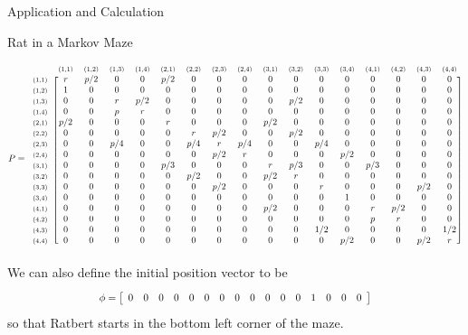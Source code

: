 \documentclass[12pt]{article}
\newcommand{\matindex}[1]{\mbox{\scriptsize#1}}
\newcommand\scalemath[2]{\scalebox{#1}{\mbox{\ensuremath{\displaystyle #2}}}}
\numberwithin{equation}{section}
\begin{document}
\begin{section}{Application and Calculation}
\begin{subsection}{Rat in a Markov Maze}
\begin{enumerate}
    \[\scalemath{0.75}{P=\begin{blockarray}{ccccccccccccccccc}&\matindex{(1,1)}&\matindex{(1,2)}&\matindex{(1,3)}&\matindex{(1,4)}&\matindex{(2,1)}&\matindex{(2,2)}&\matindex{(2,3)}&\matindex{(2,4)}&\matindex{(3,1)}&\matindex{(3,2)}&\matindex{(3,3)}&\matindex{(3,4)}&\matindex{(4,1)}&\matindex{(4,2)}&\matindex{(4,3)}&\matindex{(4,4)}\\
        \begin{block}{c[cccccccccccccccc]}\matindex{(1,1)}&r&p/2&0&0&p/2&0&0&0&0&0&0&0&0&0&0&0\\
        \matindex{(1,2)}&1&0&0&0&0&0&0&0&0&0&0&0&0&0&0&0\\
        \matindex{(1,3)}&0&0&r&p/2&0&0&0&0&0&p/2&0&0&0&0&0&0\\
        \matindex{(1,4)}&0&0&p&r&0&0&0&0&0&0&0&0&0&0&0&0\\
        \matindex{(2,1)}&p/2&0&0&0&r&0&0&0&p/2&0&0&0&0&0&0&0\\
        \matindex{(2,2)}&0&0&0&0&0&r&p/2&0&0&p/2&0&0&0&0&0&0\\
        \matindex{(2,3)}&0&0&p/4&0&0&p/4&r&p/4&0&0&p/4&0&0&0&0&0\\
        \matindex{(2,4)}&0&0&0&0&0&0&p/2&r&0&0&0&p/2&0&0&0&0\\
        \matindex{(3,1)}&0&0&0&0&p/3&0&0&0&r&p/3&0&0&p/3&0&0&0\\
        \matindex{(3,2)}&0&0&0&0&0&p/2&0&0&p/2&r&0&0&0&0&0&0\\
        \matindex{(3,3)}&0&0&0&0&0&0&p/2&0&0&0&r&0&0&0&p/2&0\\
        \matindex{(3,4)}&0&0&0&0&0&0&0&0&0&0&0&1&0&0&0&0\\
        \matindex{(4,1)}&0&0&0&0&0&0&0&0&p/2&0&0&0&r&p/2&0&0\\
        \matindex{(4,2)}&0&0&0&0&0&0&0&0&0&0&0&0&p&r&0&0\\
        \matindex{(4,3)}&0&0&0&0&0&0&0&0&0&0&1/2&0&0&0&0&1/2\\
        \matindex{(4,4)}&0&0&0&0&0&0&0&0&0&0&0&p/2&0&0&p/2&r\\
        \end{block}
        \end{blockarray}}\]
We can also define the initial position vector to be
\[\scalemath{0.8}{\phi=\left[\begin{array}{ccccccccccccccccc}0&0&0&0&0&0&0&0&0&0&0&0&1&0&0&0\end{array}\right]}\]
so that Ratbert starts in the bottom left corner of the maze.


\end{enumerate}
\end{subsection}
\end{section}
\end{document}
